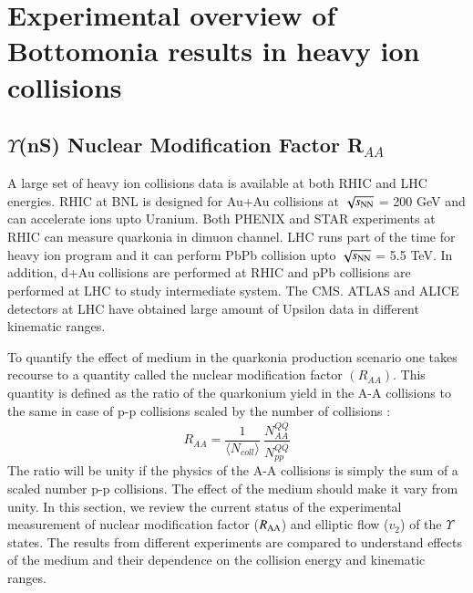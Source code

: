 \section{Experimental overview of Bottomonia results in heavy ion collisions}



\subsection{$\Upsilon$(nS) Nuclear Modification Factor R$_{AA}$}
A large set of heavy ion collisions data is available at both RHIC and LHC energies.
RHIC at BNL is designed for Au+Au collisions
at $\sqrt{s_{\rm NN}}$ = 200 GeV and can accelerate ions upto Uranium. Both PHENIX and
STAR experiments at RHIC can measure quarkonia in dimuon channel. 
LHC runs part of the time for heavy ion program and it
can perform PbPb collision upto $\sqrt{s_{\rm NN}}$ = 5.5 TeV. In addition, d+Au collisions
are performed at RHIC and pPb collisions are performed at LHC to study
intermediate system. The CMS. ATLAS and ALICE detectors at LHC have obtained large
amount of Upsilon data in different kinematic ranges.

To quantify the effect of medium in the quarkonia production scenario one takes
recourse to a quantity called the nuclear modification factor $(R_{AA})$. This quantity
is defined as the ratio of the quarkonium yield in the A-A collisions to the same
in case of p-p collisions scaled by the number of collisions : 
 \begin{equation}
 R_{AA} = \frac{1}{\langle N_{coll} \rangle} \ \frac {N^{Q{\bar Q}}_{AA}} {N^{Q{\bar Q}}_{pp}} 
 \end{equation}
 The ratio will be unity if the physics of the A-A collisions is simply the sum of
 a scaled number p-p collisions. The effect of the medium should make it vary from unity. 
In this section, we review the current status of the experimental measurement
of nuclear modification factor ($R_{\rm AA}$) and elliptic flow ($v_{2}$) of the
$\Upsilon$ states. The results from different experiments are compared to
understand effects of the medium and their dependence on the collision energy
and kinematic ranges. 



